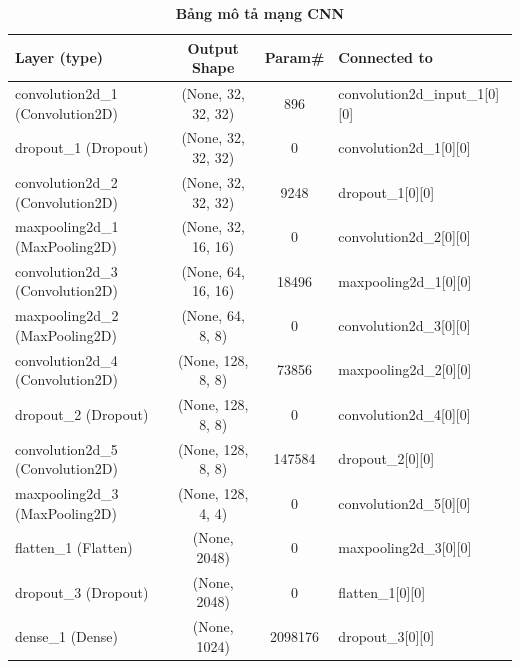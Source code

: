 \documentclass[a4paper,12pt]{report}
\begin{document}
{\small
\begin{center}
\begin{longtable}{lccl}
\caption{\textbf{Bảng mô tả mạng CNN}}
\label{variability_impl_mech}
\endfirsthead
\endhead
\hline
	Layer (type)              &      Output Shape     &     Param\#   &  Connected to  \\
\hline
convolution2d\_1 (Convolution2D) & (None, 32, 32, 32) &   896    &     convolution2d\_input\_1[0][0]     \\
\hline
dropout\_1 (Dropout)          &    (None, 32, 32, 32)  &  0     &      convolution2d\_1[0][0]            \\
\hline
convolution2d\_2 (Convolution2D)&  (None, 32, 32, 32) &   9248   &     dropout\_1[0][0]          \\        
\hline
maxpooling2d\_1 (MaxPooling2D)   & (None, 32, 16, 16)&    0       &    convolution2d\_2[0][0]      \\      
\hline
convolution2d\_3 (Convolution2D) & (None, 64, 16, 16) &   18496   &    maxpooling2d\_1[0][0] \\             
\hline
maxpooling2d\_2 (MaxPooling2D)   & (None, 64, 8, 8)    &  0        &   convolution2d\_3[0][0] \\
\hline
convolution2d\_4 (Convolution2D) & (None, 128, 8, 8)  &   73856   &    maxpooling2d\_2[0][0]      \\       
\hline
dropout\_2 (Dropout)  &            (None, 128, 8, 8) &    0   &        convolution2d\_4[0][0]       \\     

\hline
convolution2d\_5 (Convolution2D)&  (None, 128, 8, 8) &    147584 &     dropout\_2[0][0]            \\      

\hline
maxpooling2d\_3 (MaxPooling2D) &   (None, 128, 4, 4) &    0   &        convolution2d\_5[0][0]     \\       

\hline
flatten\_1 (Flatten)        &      (None, 2048) &         0    &       maxpooling2d\_3[0][0]    \\        

\hline
dropout\_3 (Dropout)    &          (None, 2048)  &        0   &        flatten\_1[0][0]    \\              

\hline
dense\_1 (Dense)      &            (None, 1024)     &     2098176   &  dropout\_3[0][0]    \\              


\end{longtable}
\end{center}}
\end{document}
